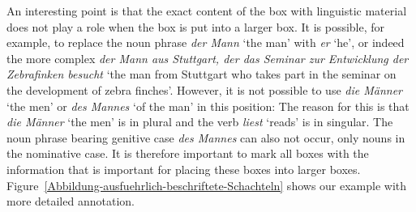 {An interesting point is that the exact content of the box with linguistic material does not play a
role when the box is put into a larger box. It is possible, for example, to replace
the noun phrase \emph{der Mann} `the man' with \emph{er} `he', or indeed the more complex \emph{der Mann aus Stuttgart, der das Seminar zur Entwicklung der Zebrafinken besucht} `the man from Stuttgart
who takes part in the seminar on the development of zebra finches'. However, it is not possible to use \emph{die Männer} `the men' or \emph{des Mannes} `of the man' in this position:
\eal 
{} 
\zl 
The reason for this is that \emph{die Männer} `the men' is in plural and the verb \emph{liest} `reads' is in singular. The noun phrase bearing genitive case \emph{des Mannes} can also
not occur, only nouns in the nominative case. It is therefore important to mark all boxes with the information that is important for placing these boxes into larger boxes.
Figure~\vref{Abbildung-ausfuehrlich-beschriftete-Schachteln} shows our example with more detailed annotation.

}
